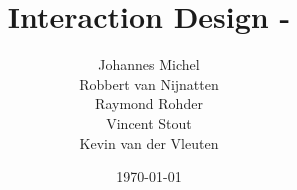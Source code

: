 


\author{Johannes Michel\\Robbert van Nijnatten\\Raymond Rohder\\Vincent Stout\\Kevin van der Vleuten}
\title{Interaction Design - \projectname}
\date{\today}



\maketitle

\renewcommand*\contentsname{Inhoud}
\tableofcontents

%










